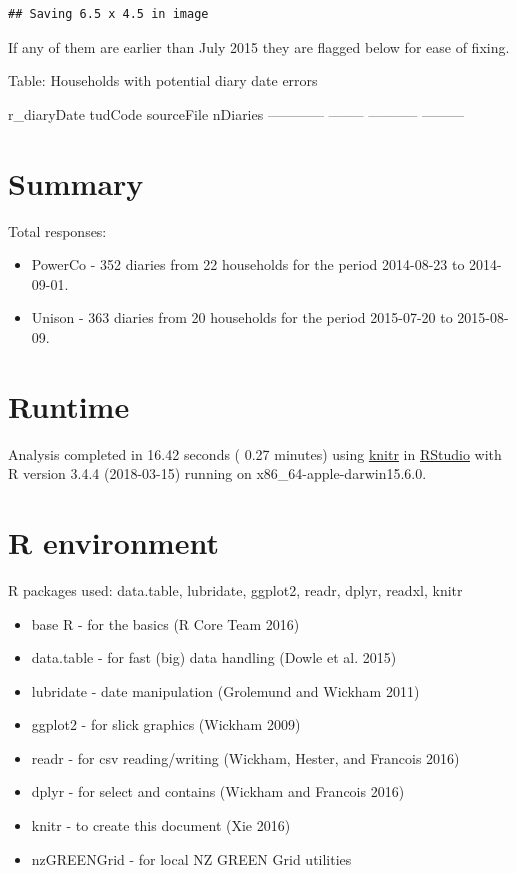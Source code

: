 \documentclass[]{article}
\providecommand{\tightlist}{%
  \setlength{\itemsep}{0pt}\setlength{\parskip}{0pt}}
\begin{document}
\begin{verbatim}
## Saving 6.5 x 4.5 in image
\end{verbatim}

If any of them are earlier than July 2015 they are flagged below for
ease of fixing.

Table: Households with potential diary date errors

r\_diaryDate tudCode sourceFile nDiaries ------------ --------
----------- ---------

\section{Summary}\label{summary}

Total responses:

\begin{itemize}
\tightlist
\item
  PowerCo - 352 diaries from 22 households for the period 2014-08-23 to
  2014-09-01.
\item
  Unison - 363 diaries from 20 households for the period 2015-07-20 to
  2015-08-09.
\end{itemize}

\section{Runtime}\label{runtime}

Analysis completed in 16.42 seconds ( 0.27 minutes) using
\href{https://cran.r-project.org/package=knitr}{knitr} in
\href{http://www.rstudio.com}{RStudio} with R version 3.4.4 (2018-03-15)
running on x86\_64-apple-darwin15.6.0.

\section{R environment}\label{r-environment}

R packages used: data.table, lubridate, ggplot2, readr, dplyr, readxl,
knitr

\begin{itemize}
\tightlist
\item
  base R - for the basics (R Core Team 2016)
\item
  data.table - for fast (big) data handling (Dowle et al. 2015)
\item
  lubridate - date manipulation (Grolemund and Wickham 2011)
\item
  ggplot2 - for slick graphics (Wickham 2009)
\item
  readr - for csv reading/writing (Wickham, Hester, and Francois 2016)
\item
  dplyr - for select and contains (Wickham and Francois 2016)
\item
  knitr - to create this document (Xie 2016)
\item
  nzGREENGrid - for local NZ GREEN Grid utilities
\end{itemize}
\end{document}
